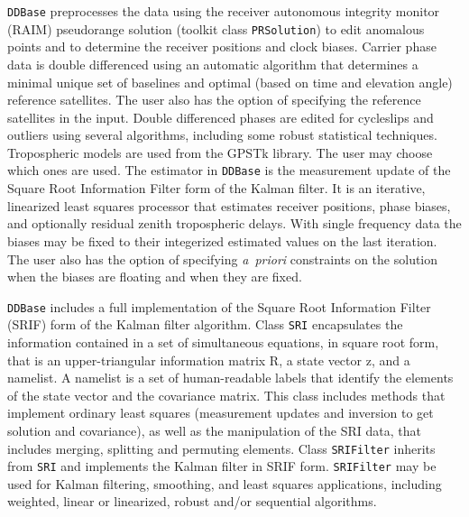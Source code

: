 \documentclass{ion-gps}
\newcommand{\gpstkapplication}[1]{\texttt{#1}}
\newcommand{\gpstkclass}[1]{\texttt{#1}}
\begin{document}
\gpstkapplication{DDBase} preprocesses the data using the receiver autonomous integrity monitor
(RAIM) pseudorange solution (toolkit
class \gpstkclass{PRSolution}) to edit anomalous points and to
determine the receiver positions and clock biases. Carrier phase data
is double differenced using an automatic algorithm that determines a
minimal unique set of baselines and optimal (based on time and
elevation angle) reference satellites. The user also has the option of
specifying the reference satellites in the input. Double differenced
phases are edited for cycleslips and outliers using several
algorithms, including some robust statistical techniques. Tropospheric
models are used from the GPSTk library.  The user may choose which ones
are used. The estimator in \gpstkapplication{DDBase} is the
measurement update of the Square Root Information Filter form of the
Kalman filter. It is an iterative, linearized
least squares processor that estimates receiver positions, phase
biases, and optionally residual zenith tropospheric delays. With
single frequency data the biases may be fixed to their integerized
estimated values on the last iteration. The user also has the option
of specifying \mbox{{\it a priori}} constraints on the solution when the
biases are floating and when they are fixed.

\gpstkapplication{DDBase} includes a full implementation of the Square
Root Information Filter (SRIF) form of the Kalman filter
algorithm\cite{biermann}.  Class \gpstkclass{SRI} encapsulates the
information contained in a set of simultaneous equations, in square
root form, that is an upper-triangular information matrix R, a
state vector z, and a namelist. A namelist is a set of
human-readable labels that identify the elements of the state vector
and the covariance matrix. This class includes methods that implement
ordinary least squares (measurement updates and inversion to get
solution and covariance), as well as the manipulation of the SRI data,
that includes merging, splitting and permuting elements. Class
\gpstkclass{SRIFilter} inherits from \gpstkclass{SRI} and implements
the Kalman filter in SRIF form. \gpstkclass{SRIFilter} may be used for
Kalman filtering, smoothing, and least squares applications, including
weighted, linear or linearized, robust and/or sequential algorithms.
\end{document}
